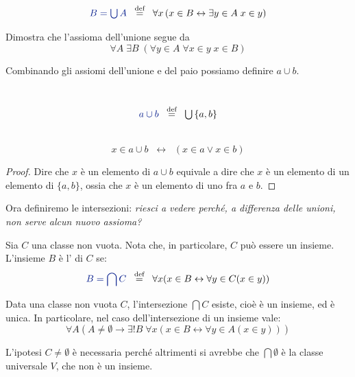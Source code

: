 \begin{notation}
\ 
\baselineskip
	\[ {\drkblu B = \union A} \;\;\Mydef\;\; \forall x \,( x \in B
\leftrightarrow \exists {y \in A} \; x \in y) \]
\end{notation}

\begin{exercise}
	Dimostra che l'assioma dell'unione segue da
	\[ \forall A \; \exists B \; (\forall y \in A \; \forall x \in y \; x \in B)
		\]
\end{exercise}

Combinando gli assiomi dell'unione e del paio possiamo definire $a \cup b$.

\begin{definition}
\ 
\baselineskip
	\[ {\drkblu a \cup b} \;\;\Mydef\;\; \union\{a,b\}
		\]
\end{definition}

\begin{proposition}
\ 
\vskip-3\baselineskip
	\[ x \in a \cup b \;\;\leftrightarrow\;\; (x \in a \lor x \in b)
		\]
\end{proposition}

\begin{proof}
	Dire che $x$ \`e un elemento di $a \cup b$ equivale a dire che $x$ \`e un elemento di un elemento di $\{a,b\}$, ossia
	che $x$ \`e un elemento di uno fra $a$ e $b$.
\end{proof}

Ora definiremo le intersezioni: \emph{riesci a vedere perch\'e, a
differenza delle unioni, non serve alcun nuovo assioma?}

\begin{definition}
	Sia $C$ una {\drkred classe} non vuota. {\drkgrn Nota che, in particolare, $C$ pu\`o
essere un insieme.}
	L'{\drkred insieme} $B$ \`e l'\vocab{intersezione} di $C$ se:
	\[ {\drkblu B = \bigcap C} \;\;\Mydef\;\; \forall x (x \in B \leftrightarrow
\forall {y \in C} (x \in y))
		\]
\end{definition}

\begin{proposition}
	Data una classe non vuota $C$, l'intersezione $\bigcap C$ esiste,
cio\`e \`e un insieme, ed \`e unica. In particolare, nel caso dell'intersezione di un insieme vale:
	\[ \forall A (A \ne \emptyset \rightarrow \exists ! B \; \forall x(x \in B \leftrightarrow \forall y \in A (x \in y)))
		\]
\end{proposition}

\begin{note}
	L'ipotesi $C \ne \emptyset$ \`e necessaria perch\'e altrimenti si avrebbe che $\bigcap \emptyset$ \`e la classe universale $V$, che non \`e un insieme.
\end{note}

